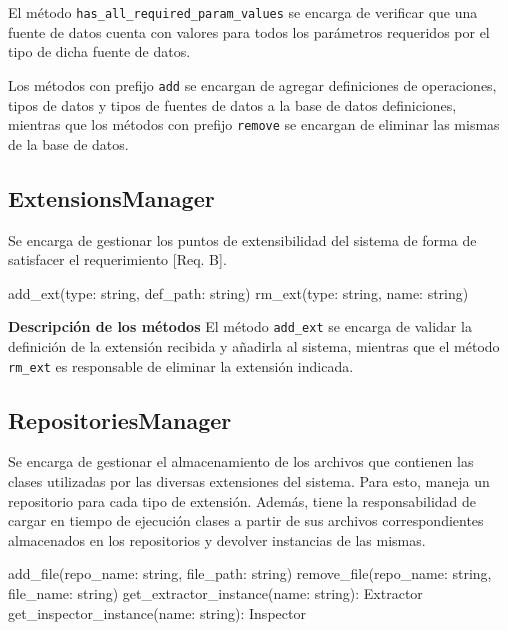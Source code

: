 El método \texttt{has\_all\_required\_param\_values} se encarga de verificar que una fuente de datos cuenta con valores para todos los parámetros requeridos por el tipo de dicha fuente de datos.

Los métodos con prefijo \texttt{add} se encargan de agregar definiciones de operaciones, tipos de datos y tipos de fuentes de datos a la base de datos definiciones, mientras que los métodos con prefijo \texttt{remove} se encargan de eliminar las mismas de la base de datos.

\subsection{ExtensionsManager}
Se encarga de gestionar los puntos de extensibilidad del sistema de forma de satisfacer el requerimiento [Req. B].
\newline

\begin{python}[title=Interfaz ExtensionsManager, captionpos=b]
add_ext(type: string, def_path: string)
rm_ext(type: string, name: string)
\end{python}

\textbf{Descripción de los métodos} \newline
El método \texttt{add\_ext} se encarga de validar la definición de la extensión recibida y añadirla al sistema, mientras que el método \texttt{rm\_ext} es responsable de eliminar la extensión indicada.

\subsection{RepositoriesManager}
Se encarga de gestionar el almacenamiento de los archivos que contienen las clases utilizadas por las diversas extensiones del sistema. Para esto, maneja un repositorio para cada tipo de extensión. Además, tiene la responsabilidad de cargar en tiempo de ejecución clases a partir de sus archivos correspondientes almacenados en los repositorios y devolver instancias de las mismas.
\newline

\begin{python}[title=Interfaz RepositoriesManager, captionpos=b]
add_file(repo_name: string, file_path: string)
remove_file(repo_name: string, file_name: string)
get_extractor_instance(name: string): Extractor
get_inspector_instance(name: string): Inspector
\end{python}

